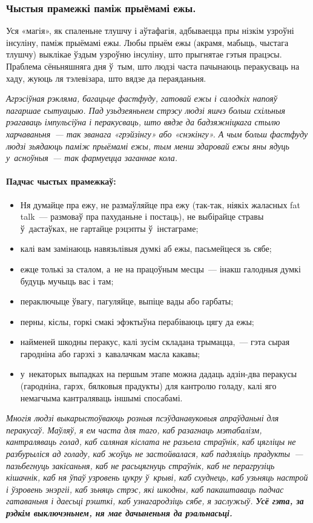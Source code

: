 \subsubsection{Чыстыя прамежкі паміж прыёмамі ежы.}
Уся «магія», як спаленьне тлушчу і аўтафагія, адбываецца пры нізкім узроўні інсуліну, паміж прыёмамі ежы. Любы прыём ежы (акрамя, мабыць, чыстага тлушчу) выклікае ўздым узроўню інсуліну, што прыгнятае гэтыя працэсы. Праблема сёньняшняга дня ў~тым, што людзі часта пачынаюць перакусваць на хаду, жуюць ля тэлевізара, што вядзе да пераяданьня.

\emph{Агрэсіўная рэкляма, багацьце фастфуду, гатовай ежы і салодкіх напояў пагаршае сытуацыю. Пад узьдзеяньнем стрэсу людзі яшчэ больш схільныя рэагаваць імпульсіўна і перакусваць, што вядзе да бадзяжніцкага стылю харчаваньня~--- так званага «грэйзінгу» або «снэкінгу». А чым больш фастфуду людзі зьядаюць паміж прыёмамі ежы, тым менш здаровай ежы яны ядуць у~асноўныя~--- так фармуецца заганнае кола.}

\paragraph{Падчас чыстых прамежкаў:}
\begin{itemize}
  \item Ня думайце пра ежу, не размаўляйце пра ежу (так-так, ніякіх жаласных fat talk~--- размоваў пра пахуданьне і постаць), не выбірайце стравы ў~дастаўках, не гартайце рэцэпты ў~інстаграме;
  \item калі вам замінаюць навязьлівыя думкі аб ежы, пасьмейцеся зь сябе;
  \item ежце толькі за сталом, а~не на працоўным месцы~--- інакш галодныя думкі будуць мучыць вас і там;
  \item пераключыце ўвагу, пагуляйце, выпіце вады або гарбаты;
  \item перны, кіслы, горкі смакі эфэктыўна перабіваюць цягу да ежы;
  \item найменей шкодны перакус, калі зусім складана трымацца,~--- гэта сырая гародніна або гарэхі з~кавалачкам масла какавы;
  \item у~некаторых выпадках на першым этапе можна дадаць адзін-два перакусы (гародніна, гарэх, бялковыя прадукты) для кантролю голаду, калі яго немагчыма кантраляваць іншымі спосабамі.
\end{itemize}

\emph{Многія людзі выкарыстоўваюць розныя псэўданавуковыя апраўданьні для перакусаў. Маўляў, я ем часта для таго, каб разагнаць мэтабалізм, кантраляваць голад, каб саляная кіслата не разьела страўнік, каб цягліцы не разбурыліся ад голаду, каб жоўць не застойвалася, каб падзяліць прадукты~--- пазьбегнуць закісаньня, каб не расьцягнуць страўнік, каб не перагрузіць кішачнік, каб ня ўпаў узровень цукру ў~крыві, каб схуднець, каб узьняць настрой і ўзровень энэргіі, каб зьняць стрэс, які шкодны, каб пакаштаваць падчас гатаваньня і даесьці рэшткі, каб узнагародзіць сябе, я заслужыў. \textbf{Усё гэта, за рэдкім выключэньнем, ня мае дачыненьня да рэальнасьці.}}

